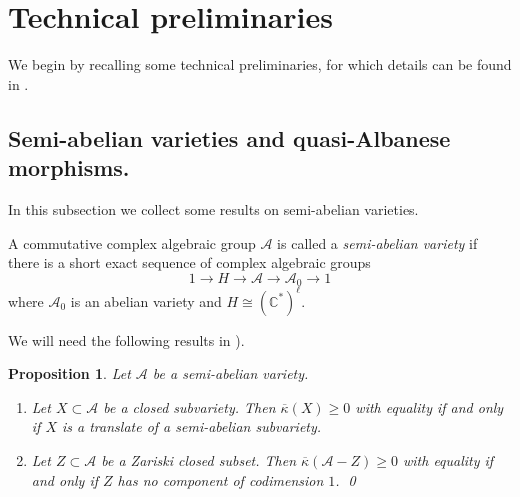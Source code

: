 \documentclass[11pt,english]{smfart}
\theoremstyle{plain}
\newtheorem{proposition}[thm]{Proposition}
\theoremstyle{definition}
\theoremstyle{remark}
\numberwithin{equation}{subsection}
\theoremstyle{plain}
\newcommand{\cA}{\mathcal A}
\newcommand{\bC}{\mathbb{C}}
\begin{document}
\section{Technical preliminaries}\label{sec:pre}
We begin by recalling some technical preliminaries, for which details can be found in \cite{NW13,CDY22,CDY25}.
\subsection{Semi-abelian varieties and quasi-Albanese morphisms.} In this subsection we collect some results on  semi-abelian varieties.  

 A commutative complex algebraic  group $\cA$ is called a \emph{semi-abelian variety} if there is a short exact sequence of complex algebraic groups  
$$
1 \rightarrow H \rightarrow \cA \rightarrow \cA_0 \rightarrow 1
$$
where $\cA_0$ is an abelian variety and $H \cong (\bC^*)^\ell$. 

 


We will need the following results in \cite[Propositions 5.6.21 \& 5.6.22]{NW13}).  
\begin{proposition} \label{prop:Koddimabb}
	Let \(\cA\) be a semi-abelian variety. 
	\begin{enumerate}[label=(\alph*)]
		\item Let \(X \subset \cA\) be a closed subvariety. Then \(\overline{\kappa}(X) \geq 0\) with equality if and only if \(X\) is a translate of a semi-abelian subvariety.
		\item Let \(Z \subset \cA\) be a Zariski closed subset. Then \(\overline{\kappa}(\cA - Z) \geq 0\) with equality if and only if \(Z\) has no component of codimension \(1\).  \qed
	\end{enumerate}
\end{proposition}
 
\end{document}
